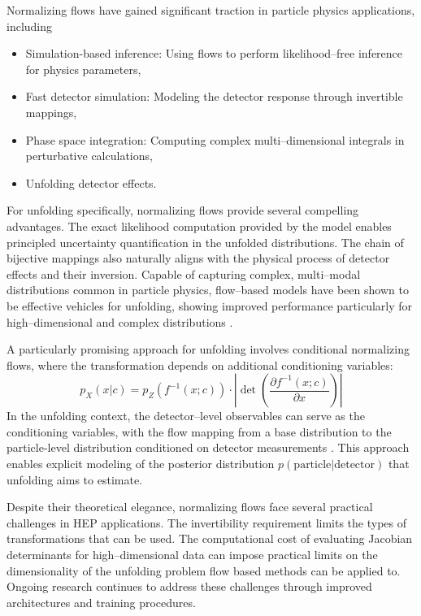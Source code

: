         Normalizing flows have gained significant traction in particle physics applications, including
        \begin{itemize}
            \item Simulation-based inference: Using flows to perform likelihood--free inference for physics parameters, 
            \item Fast detector simulation: Modeling the detector response through invertible mappings, 
            \item Phase space integration: Computing complex multi--dimensional integrals in perturbative calculations, 
            \item Unfolding detector effects.
        \end{itemize}
        For unfolding specifically, normalizing flows provide several compelling advantages.
        The exact likelihood computation provided by the model enables principled uncertainty quantification in the unfolded distributions.
        The chain of bijective mappings also naturally aligns with the physical process of detector effects and their inversion.
        Capable of capturing complex, multi--modal distributions common in particle physics, flow--based models have been shown to be effective vehicles for unfolding, showing improved performance particularly for high--dimensional and complex distributions .

        A particularly promising approach for unfolding involves conditional normalizing flows, where the transformation depends on additional conditioning variables:
        \begin{equation}
            p_X(x|c) = p_Z(f^{-1}(x; c)) \cdot \left|\det\left(\frac{\partial f^{-1}(x; c)}{\partial x}\right)\right|
        \end{equation}
        In the unfolding context, the detector--level observables can serve as the conditioning variables, with the flow mapping from a base distribution to the particle-level distribution conditioned on detector measurements .
        This approach enables explicit modeling of the posterior distribution 
        \(p(\text{particle} | \text{detector})\) that unfolding aims to estimate.

        Despite their theoretical elegance, normalizing flows face several practical challenges in HEP applications.
        The invertibility requirement limits the types of transformations that can be used.
        The computational cost of evaluating Jacobian determinants for high--dimensional data can impose practical limits on the dimensionality of the unfolding problem flow based methods can be applied to.
        Ongoing research continues to address these challenges through improved architectures and training procedures.

